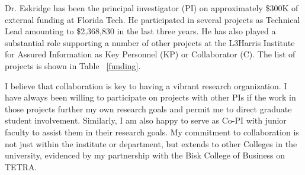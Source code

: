 \documentclass[12pt,letterpaper]{report}
\begin{document}


Dr. Eskridge has been the principal investigator (PI) on approximately \$300K of external funding at Florida Tech.  He participated in several projects as Technical Lead amounting to \$2,368,830 in the last three years. He has also played a substantial role supporting a number of other projects at the L3Harris Institute for Assured Information as Key Personnel (KP) or Collaborator (C).  The list of projects is shown in  Table ~\ref{funding}.  

I believe that collaboration is key to having a vibrant research organization. I have always been willing to participate on projects with other PIs if the work in those projects further my own research goals and permit me to direct graduate student involvement.  Similarly, I am also happy to serve as Co-PI with junior faculty to assist them in their research goals.  My commitment to collaboration is not just within the institute or department, but extends to other Colleges in the university, evidenced by my partnership with the Bisk College of Business on TETRA. 
\end{document}
